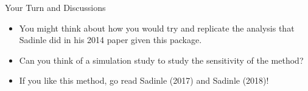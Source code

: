\documentclass[
  ignorenonframetext,
]{beamer}
\begin{document}
\begin{frame}{Your Turn and Discussions}
\protect\hypertarget{your-turn-and-discussions-1}{}

\begin{itemize}
\item
  You might think about how you would try and replicate the analysis
  that Sadinle did in his 2014 paper given this package.
\item
  Can you think of a simulation study to study the sensitivity of the
  method?
\item
  If you like this method, go read Sadinle (2017) and Sadinle (2018)!
\end{itemize}

\end{frame}
\end{document}
